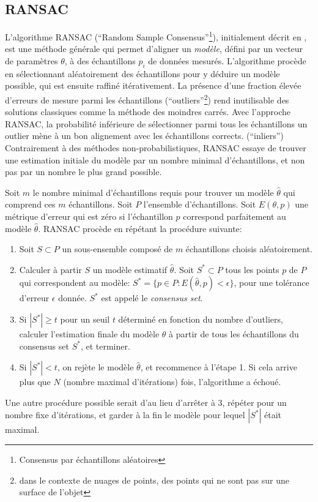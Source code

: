 \documentclass[a4paper,10pt]{scrreprt}
\begin{document}
\subsection{RANSAC}
L'algorithme RANSAC (``Random Sample Consensus''\footnote{Consensus par échantillons aléatoires}), initialement décrit en \cite{Fisc1980}, est une méthode générale qui permet d'aligner un \emph{modèle}, défini par un vecteur de paramètres $\theta$, à des échantillons $p_i$ de données mesurés. L'algorithme procède en sélectionnant aléatoirement des échantillons pour y déduire un modèle possible, qui est ensuite raffiné itérativement. La présence d'une fraction élevée d'erreurs de mesure parmi les échantillons (``outliers''\footnote{dans le contexte de nuages de points, des points qui ne sont pas sur une surface de l'objet}) rend inutilisable des solutions classiques comme la méthode des moindres carrés. Avec l'approche RANSAC, la probabilité inférieure de sélectionner parmi tous les échantillons un outlier mène à un bon alignement avec les échantillons corrects. (``inliers'') Contrairement à des méthodes non-probabilistiques, RANSAC essaye de trouver une estimation initiale du modèle par un nombre minimal d'échantillons, et non pas par un nombre le plus grand possible.

Soit $m$ le nombre minimal d'échantillons requis pour trouver un modèle $\hat{\theta}$ qui comprend ces $m$ échantillons. Soit $P$ l'ensemble d'échantillons. Soit $E(\theta, p)$ une métrique d'erreur qui est zéro si l'échantillon $p$ correspond parfaitement au modèle $\hat{\theta}$. RANSAC procède en répétant la procédure suivante:
\begin{enumerate}
	\item Soit $S \subset P$ un sous-ensemble composé de $m$ échantillons choisis aléatoirement.
	\item Calculer à partir $S$ un modèle estimatif $\hat{\theta}$. Soit $S^* \subset P$ tous les points $p$ de $P$ qui correspondent au modèle: $S^* = \{ p \in P : E(\hat{\theta}, p) < \epsilon \}$, pour une tolérance d'erreur $\epsilon$ donnée. $S^*$ est appelé le \emph{consensus set}.
	\item Si $|S^*| \geq t$ pour un seuil $t$ déterminé en fonction du nombre d'outliers, calculer l'estimation finale du modèle $\theta$ à partir de tous les échantillons du consensus set $S^*$, et terminer.
	\item Si $|S^*| < t$, on rejète le modèle $\hat{\theta}$, et recommence à l'étape 1. Si cela arrive plus que $N$ (nombre maximal d'itérations) fois, l'algorithme a échoué.
\end{enumerate}
Une autre procédure possible serait d'au lieu d'arrêter à 3, répéter pour un nombre fixe d'itérations, et garder à la fin le modèle pour lequel $|S^*|$ était maximal. 
\end{document}
